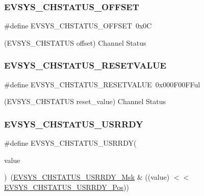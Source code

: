 \subsubsection{\texorpdfstring{EVSYS\_CHSTATUS\_OFFSET}{EVSYS\_CHSTATUS\_OFFSET}}
{\footnotesize\ttfamily \#define E\+V\+S\+Y\+S\+\_\+\+C\+H\+S\+T\+A\+T\+U\+S\+\_\+\+O\+F\+F\+S\+ET~0x0C}



(E\+V\+S\+Y\+S\+\_\+\+C\+H\+S\+T\+A\+T\+US offset) Channel Status 

\mbox{\label{group___s_a_m_d21___e_v_s_y_s_ga3d2d7543ed2981a7d35fbee301599189}} 
\subsubsection{\texorpdfstring{EVSYS\_CHSTATUS\_RESETVALUE}{EVSYS\_CHSTATUS\_RESETVALUE}}
{\footnotesize\ttfamily \#define E\+V\+S\+Y\+S\+\_\+\+C\+H\+S\+T\+A\+T\+U\+S\+\_\+\+R\+E\+S\+E\+T\+V\+A\+L\+UE~0x000\+F00\+F\+Ful}



(E\+V\+S\+Y\+S\+\_\+\+C\+H\+S\+T\+A\+T\+US reset\+\_\+value) Channel Status 

\mbox{\label{group___s_a_m_d21___e_v_s_y_s_ga295c34f5c69a2b004da0dd64c3e47168}} 
\subsubsection{\texorpdfstring{EVSYS\_CHSTATUS\_USRRDY}{EVSYS\_CHSTATUS\_USRRDY}}
{\footnotesize\ttfamily \#define E\+V\+S\+Y\+S\+\_\+\+C\+H\+S\+T\+A\+T\+U\+S\+\_\+\+U\+S\+R\+R\+DY(\begin{DoxyParamCaption}\item[{}]{value }\end{DoxyParamCaption})~(\mbox{\hyperlink{group___s_a_m_d21___e_v_s_y_s_ga16a09e90156c8447d3ed7f59699eb3c3}{E\+V\+S\+Y\+S\+\_\+\+C\+H\+S\+T\+A\+T\+U\+S\+\_\+\+U\+S\+R\+R\+D\+Y\+\_\+\+Msk}} \& ((value) $<$$<$ \mbox{\hyperlink{group___s_a_m_d21___e_v_s_y_s_ga94f145b3b3e74ba31c684f04202e6777}{E\+V\+S\+Y\+S\+\_\+\+C\+H\+S\+T\+A\+T\+U\+S\+\_\+\+U\+S\+R\+R\+D\+Y\+\_\+\+Pos}}))}

